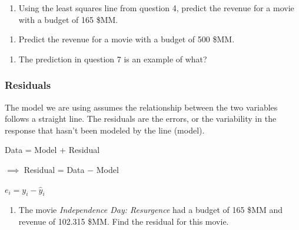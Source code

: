 \documentclass[
]{report}
\providecommand{\tightlist}{%
  \setlength{\itemsep}{0pt}\setlength{\parskip}{0pt}}
\begin{document}
\vspace{.8in}

\begin{enumerate}
\def\labelenumi{\arabic{enumi}.}
\setcounter{enumi}{5}
\tightlist
\item
  Using the least squares line from question 4, predict the revenue for a movie with a budget of 165 \$MM.
\end{enumerate}

\vspace{.6in}

\begin{enumerate}
\def\labelenumi{\arabic{enumi}.}
\setcounter{enumi}{6}
\tightlist
\item
  Predict the revenue for a movie with a budget of 500 \$MM.
\end{enumerate}

\vspace{0.8in}

\begin{enumerate}
\def\labelenumi{\arabic{enumi}.}
\setcounter{enumi}{7}
\tightlist
\item
  The prediction in question 7 is an example of what?
\end{enumerate}

\vspace{0.3in}

\hypertarget{residuals}{%
\subsubsection*{Residuals}\label{residuals}}

The model we are using assumes the relationship between the two variables follows a straight line. The residuals are the errors, or the variability in the response that hasn't been modeled by the line (model).

\begin{center}
Data = Model + Residual

$\implies$ Residual = Data $-$ Model

$e_i=y_i-\hat{y}_i$
\end{center}

\begin{enumerate}
\def\labelenumi{\arabic{enumi}.}
\setcounter{enumi}{8}
\tightlist
\item
  The movie \emph{Independence Day: Resurgence} had a budget of 165 \$MM and revenue of 102.315 \$MM. Find the residual for this movie.
\end{enumerate}
\end{document}
